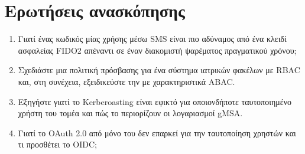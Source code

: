 \section*{Ερωτήσεις ανασκόπησης}
\begin{enumerate}
  \item Γιατί ένας κωδικός μίας χρήσης μέσω SMS είναι πιο αδύναμος από ένα κλειδί ασφαλείας FIDO2 απέναντι σε έναν διακομιστή ψαρέματος πραγματικού χρόνου;
  \item Σχεδιάστε μια πολιτική πρόσβασης για ένα σύστημα ιατρικών φακέλων με RBAC και, στη συνέχεια, εξειδικεύστε την με χαρακτηριστικά ABAC.
  \item Εξηγήστε γιατί το Kerberoasting είναι εφικτό για οποιονδήποτε ταυτοποιημένο χρήστη του τομέα και πώς το περιορίζουν οι λογαριασμοί gMSA.
  \item Γιατί το OAuth 2.0 από μόνο του δεν επαρκεί για την ταυτοποίηση χρηστών και τι προσθέτει το OIDC;
\end{enumerate}
